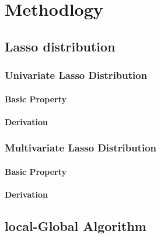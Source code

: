 \chapter{Methodlogy}
\label{Chapter3}

\section{Lasso distribution}
\subsection{Univariate Lasso Distribution}
\subsubsection{Basic Property}
\subsubsection{Derivation}

\subsection{Multivariate Lasso Distribution}
\subsubsection{Basic Property}
\subsubsection{Derivation}

\section{local-Global Algorithm}
